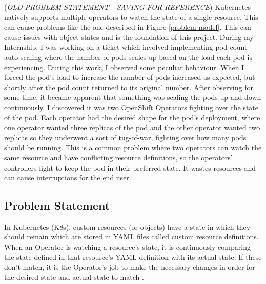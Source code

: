 \documentclass{article}
\begin{document}
(\emph{OLD PROBLEM STATEMENT - SAVING FOR REFERENCE}) Kubernetes natively supports multiple operators to watch the state of a single resource. This can cause problems like the one described in Figure \ref{problem-model}. This can cause issues with object states and is the foundation of this project. During my Internship, I was working on a ticket which involved implementing pod count auto-scaling where the number of pods scales up based on the load each pod is experiencing. During this work, I observed some peculiar behaviour. When I forced the pod’s load to increase the number of pods increased as expected, but shortly after the pod count returned to its original number. After observing for some time, it became apparent that something was scaling the pods up and down continuously. I discovered it was two OpenShift Operators fighting over the state of the pod. Each operator had the desired shape for the pod’s deployment, where one operator wanted three replicas of the pod and the other operator wanted two replicas so they underwent a sort of tug-of-war, fighting over how many pods should be running. This is a common problem where two operators can watch the same resource and have conflicting resource definitions, so the operators' controllers fight to keep the pod in their preferred state. It wastes resources and can cause interruptions for the end user.


\subsection{Problem Statement}
In Kubernetes (K8s), custom resources (or objects) have a state in which they should remain which are stored in YAML files called custom resource definitions. When an Operator is watching a resource's state, it is continuously comparing the state defined in that resource's YAML definition with its actual state. If these don't match, it is the Operator's job to make the necessary changes in order for the desired state and actual state to match \cite{operator-pattern}. 
\end{document}
